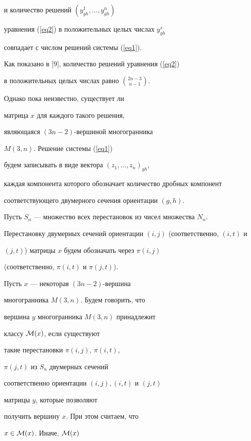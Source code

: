 и количество решений $(y^1_{gh},\dotsc,y^n_{gh})$ 


уравнения (\ref{eq2}) в положительных целых числах $y^s_{gh}$ 


совпадает с числом решений системы (\ref{eq1}).


Как показано в [9], количество решений уравнения (\ref{eq2}) 


в положительных целых числах равно ${2n-3\choose n-1}$. 


Однако пока неизвестно, существует ли


матрица $x$ для каждого такого решения, 


являющаяся $(3n-2)$-вершиной многогранника


$M(3,n)$. Решение системы (\ref{eq1}) 


будем записывать в виде вектора $(z_1,\dotsc,z_n)_{gh}$,


каждая компонента которого обозначает количество дробных компонент


соответствующего двумерного сечения ориентации $(g,h)$.





Пусть $S_n$ --- множество всех перестановок из чисел множества $N_n$.





Перестановку двумерных сечений ориентации $(i,j)$ (соответственно, $(i,t)$ и


$(j,t)$) матрицы $x$ будем обозначать через $\pi(i,j)$


(соответственно, $\pi(i,t)$ и $\pi(j,t)$).





Пусть $x$ --- некоторая $(3n-2)$-вершина 


многогранника $M(3,n)$. Будем говорить, что


вершина $y$ многогранника $M(3,n)$ принадлежит 


классу ${\cal M}(x)$, если существуют


такие перестановки $\pi(i,j)$, $\pi(i,t)$,


$\pi(j,t)$ из $S_n$ двумерных сечений


соответственно ориентации $(i,j),(i,t)$ и $(j,t)$


матрицы $y$, которые позволяют


получить вершину $x$. При этом считаем, что


$x\in{\cal M}(x)$. Иначе, ${\cal M}(x)$


